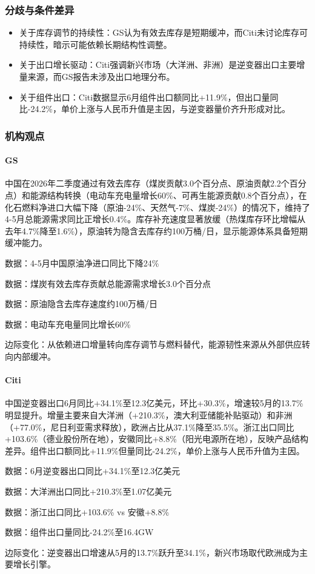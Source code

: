 \documentclass[11pt]{ctexart}
\begin{document}
\subsubsection*{分歧与条件差异}
\begin{itemize}
  \item 关于库存调节的持续性：GS认为有效去库存是短期缓冲，而Citi未讨论库存可持续性，暗示可能依赖长期结构性调整。
  \item 关于出口增长驱动：Citi强调新兴市场（大洋洲、非洲）是逆变器出口主要增量来源，而GS报告未涉及出口地理分布。
  \item 关于组件出口：Citi数据显示6月组件出口额同比+11.9\%，但出口量同比-24.2\%，单价上涨与人民币升值是主因，与逆变器量价齐升形成对比。
\end{itemize}
\subsubsection*{机构观点}
\paragraph{GS} 中国在2026年二季度通过有效去库存（煤炭贡献3.0个百分点、原油贡献2.2个百分点）和能源结构转换（电动车充电量增长60\%、可再生能源贡献0.8个百分点），在化石燃料净进口大幅下降（原油-24\%、天然气-7\%、煤炭-24\%）的情况下，维持了4-5月总能源需求同比正增长0.4\%。库存补充速度显著放缓（热煤库存环比增幅从去年4.7\%降至1.6\%），原油转为隐含去库存约100万桶/日，显示能源体系具备短期缓冲能力。
{\small\color{refgray}数据：4-5月中国原油净进口同比下降24\%\par}
{\small\color{refgray}数据：煤炭有效去库存贡献总能源需求增长3.0个百分点\par}
{\small\color{refgray}数据：原油隐含去库存速度约100万桶/日\par}
{\small\color{refgray}数据：电动车充电量同比增长60\%\par}
{\small\color{refgray}边际变化：从依赖进口增量转向库存调节与燃料替代，能源韧性来源从外部供应转向内部缓冲。\par}
\paragraph{Citi} 中国逆变器出口6月同比+34.1\%至12.3亿美元，环比+30.3\%，增速较5月的13.7\%明显提升。增量主要来自大洋洲（+210.3\%，澳大利亚储能补贴驱动）和非洲（+77.0\%，尼日利亚需求释放），欧洲占比从37.1\%降至35.5\%。浙江出口同比+103.6\%（德业股份所在地），安徽同比+8.8\%（阳光电源所在地），反映产品结构差异。组件出口额同比+11.9\%但量同比-24.2\%，单价上涨与人民币升值为主因。
{\small\color{refgray}数据：6月逆变器出口同比+34.1\%至12.3亿美元\par}
{\small\color{refgray}数据：大洋洲出口同比+210.3\%至1.07亿美元\par}
{\small\color{refgray}数据：浙江出口同比+103.6\% vs 安徽+8.8\%\par}
{\small\color{refgray}数据：组件出口量同比-24.2\%至16.4GW\par}
{\small\color{refgray}边际变化：逆变器出口增速从5月的13.7\%跃升至34.1\%，新兴市场取代欧洲成为主要增长引擎。\par}
\end{document}
